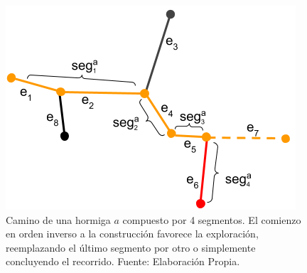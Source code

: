 \begin{figure}[h!]
    \centering
    \includegraphics[scale=0.8]{imagenes/ant_segments_complex_case_H.png}
    \caption[Camino de una hormiga $a$ compuesto por 4 segmentos.]{Camino de una hormiga $a$ compuesto por 4 segmentos. El comienzo en orden inverso a la construcci\'on favorece la exploraci\'on, reemplazando el \'ultimo segmento por otro o simplemente concluyendo el recorrido. Fuente: Elaboraci\'on Propia.}
    \label{fig:segmentComplexCaseH}
\end{figure}

